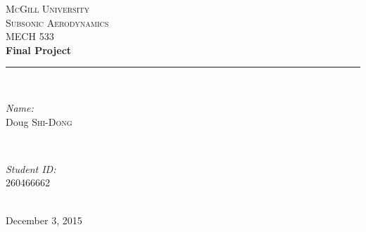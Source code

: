 \documentclass[letterpaper,12pt,]{article}
\begin{document}
\begin{titlepage}

\newcommand{\HRule}{\rule{\linewidth}{0.5mm}} %

\center %
 


\textsc{\LARGE McGill University}\\[3.5cm]
\textsc{\Large Subsonic Aerodynamics}\\[0.5cm] 
\textsc{\large MECH 533}\\[2.5cm]


{ \huge \bfseries Final Project}\\[1.5cm] %

\HRule \\[0.4cm]

\begin{minipage}{0.4\textwidth}
\begin{flushleft} \large
\emph{Name:}\\
Doug \textsc{Shi-Dong} %
\end{flushleft}
\end{minipage}
~
\begin{minipage}{0.4\textwidth}
\begin{flushright} \large
\emph{Student ID:} \\
260466662\\
\end{flushright}
\end{minipage}\\[4cm]

\vfill{}
{\large December 3, 2015}\\[2cm]

\end{titlepage}

\newcommand{\rn}{Reynolds-number }
\end{document}
